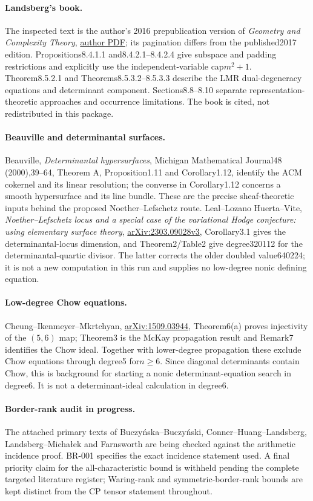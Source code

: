 \paragraph{Landsberg's book.}
The inspected text is the author's 2016 prepublication version of
\emph{Geometry and Complexity Theory},
\href{https://people.tamu.edu/~jml/simonsclass.pdf}{author PDF};
its pagination differs from the published2017 edition.
Propositions8.4.1.1 and8.4.2.1--8.4.2.4 give subspace and padding
restrictions and explicitly use the independent-variable cap$m^2+1$.
Theorem8.5.2.1 and Theorems8.5.3.2--8.5.3.3 describe the LMR
dual-degeneracy equations and determinant component. Sections8.8--8.10
separate representation-theoretic approaches and occurrence limitations.
The book is cited, not redistributed in this package.

\paragraph{Beauville and determinantal surfaces.}
Beauville, \emph{Determinantal hypersurfaces}, Michigan Mathematical
Journal48 (2000),39--64, Theorem A, Proposition1.11 and Corollary1.12,
identify the ACM cokernel and its linear resolution; the converse in
Corollary1.12 concerns a smooth hypersurface and its line bundle.
These are the precise sheaf-theoretic inputs behind the proposed
Noether--Lefschetz route. Leal--Lozano Huerta--Vite,
\emph{Noether--Lefschetz locus and a special case of the variational
Hodge conjecture: using elementary surface theory},
\href{https://arxiv.org/abs/2303.09028}{arXiv:2303.09028v3},
Corollary3.1 gives the determinantal-locus dimension, and Theorem2/Table2
give degree320112 for the determinantal-quartic divisor. The latter
corrects the older doubled value640224; it is not a new computation in
this run and supplies no low-degree nonic defining equation.

\paragraph{Low-degree Chow equations.}
Cheung--Ikenmeyer--Mkrtchyan,
\href{https://arxiv.org/abs/1509.03944}{arXiv:1509.03944},
Theorem6(a) proves injectivity of the $(5,6)$ map; Theorem3 is the
McKay propagation result and Remark7 identifies the Chow ideal.
Together with lower-degree propagation these exclude Chow equations
through degree5 for$n\ge6$. Since diagonal determinants contain Chow,
this is background for starting a nonic determinant-equation search
in degree6. It is not a determinant-ideal calculation in degree6.

\paragraph{Border-rank audit in progress.}
The attached primary texts of Buczy\'nska--Buczy\'nski,
Conner--Huang--Landsberg, Landsberg--Micha\l ek and Farnsworth are
being checked against the arithmetic incidence proof. BR-001 specifies
the exact incidence statement used. A final priority claim for the
all-characteristic bound is withheld pending the complete targeted
literature register; Waring-rank and symmetric-border-rank bounds are
kept distinct from the CP tensor statement throughout.
